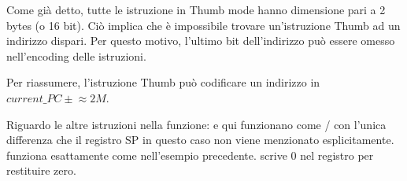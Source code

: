 Come già detto, tutte le istruzione in Thumb mode hanno dimensione pari a 2 bytes (o 16 bit).
Ciò implica che è impossibile trovare un'istruzione Thumb ad un indirizzo dispari.
Per questo motivo, l'ultimo bit dell'indirizzo può essere omesso nell'encoding delle istruzioni.

Per riassumere, l'istruzione Thumb  può codificare un indirizzo in $current\_PC \pm{}\approx{}2M$.

Riguardo le altre istruzioni nella funzione: \PUSH e \POP qui funzionano come / con
l'unica differenza che il registro \ac{SP} in questo caso non viene menzionato esplicitamente.
 funziona esattamente come nell'esempio precedente.
 scrive 0 nel registro  per restituire zero.
